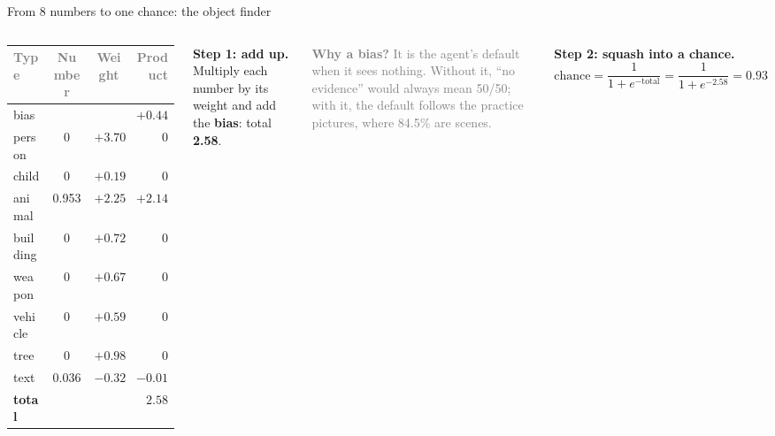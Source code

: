 \documentclass[aspectratio=169,11pt]{beamer}
\renewcommand{\arraystretch}{1.3}
\newcommand{\h}[1]{\textcolor{grey}{#1}}
\begin{document}
\begin{frame}{From 8 numbers to one chance: the object finder}
\begin{columns}[T]
\footnotesize\renewcommand{\arraystretch}{1.12}
\begin{tabular}{@{}l c c r@{}}
\toprule
\h{Type} & \h{Number} & \h{Weight} & \h{Product}\\
\midrule
bias & & & $+0.44$\\
person & 0 & $+3.70$ & 0\\
child & 0 & $+0.19$ & 0\\
animal & 0.953 & $+2.25$ & $\mathbf{+2.14}$\\
building & 0 & $+0.72$ & 0\\
weapon & 0 & $+0.67$ & 0\\
vehicle & 0 & $+0.59$ & 0\\
tree & 0 & $+0.98$ & 0\\
text & 0.036 & $-0.32$ & $-0.01$\\
\midrule
\textbf{total} & & & $\mathbf{2.58}$\\
\bottomrule
\end{tabular}
\textbf{Step 1: add up.} Multiply each number by its weight and add the \textbf{bias}: total \textbf{2.58}.

\vspace{0.15cm}
{\small\textcolor{grey}{\textbf{Why a bias?} It is the agent's default when it sees nothing. Without it, ``no evidence'' would always mean 50/50; with it, the default follows the practice pictures, where 84.5\% are scenes.}}

\vspace{0.3cm}
\textbf{Step 2: squash into a chance.}
{\small
\[ \text{chance} = \frac{1}{1 + e^{-\text{total}}} = \frac{1}{1 + e^{-2.58}} = \mathbf{0.93} \]}
\end{columns}
\end{frame}
\end{document}
